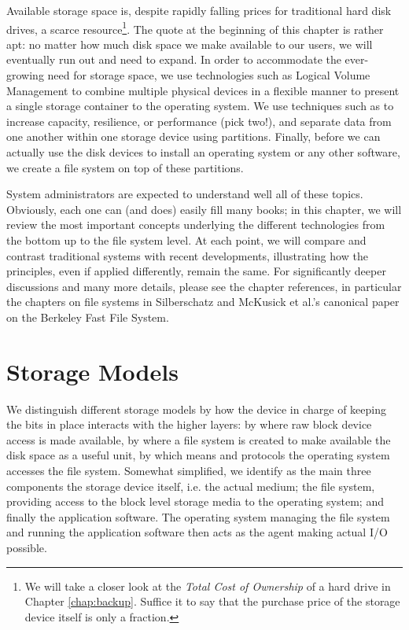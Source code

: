 Available storage space is, despite rapidly falling
prices for traditional hard disk drives, a scarce
resource\footnote{We will take a closer look at the
{\em Total Cost of Ownership} of a hard drive in Chapter
\ref{chap:backup}.  Suffice it to say that the
purchase price of the storage device itself is only a
fraction.}.  The quote at the beginning of this chapter
is rather apt: no matter how much disk space we make
available to our users, we will eventually run out and
need to expand.  In order to accommodate the
ever-growing need for storage space, we use
technologies such as Logical Volume
Management to combine
multiple physical devices in a flexible manner to
present a single storage container to the operating
system.  We use techniques such as
 to increase capacity,
resilience, or performance (pick two!), and separate
data from one another within one storage device using
partitions.  Finally, before we can actually use the
disk devices to install an operating system or any
other software, we create a file system on top of
these partitions.

System administrators are expected to understand well
all of these topics.  Obviously, each one can (and
does) easily fill many books; in this chapter, we will
review the most important concepts underlying the
different technologies from the bottom up to the file
system level.  At each point, we will compare and
contrast traditional systems with recent developments,
illustrating how the principles, even if applied
differently, remain the same.  For significantly
deeper discussions and many more details, please see
the chapter references, in particular the chapters on
file systems in
Silberschatz\cite{filesystems:silberschatz} and McKusick et al.'s canonical paper on the Berkeley Fast
File System\cite{filesystems:ffs}.


\section{Storage Models}
\label{file systems:storage-models}

We distinguish different storage models by how the
device in charge of keeping the bits in place
interacts with the higher layers: by where raw block
device access is made available, by where a file
system is created to make available the disk space as
a useful unit, by which means and protocols the
operating system accesses the file system.  Somewhat
simplified, we identify as the main three components
the storage device itself, i.e. the actual medium; the
file system, providing access to the block level
storage media to the operating system; and finally the
application software.  The operating system managing
the file system and running the application software
then acts as the agent making actual I/O possible.

